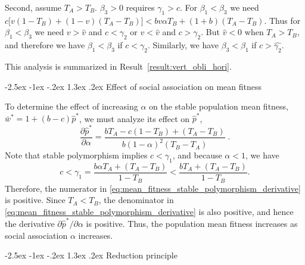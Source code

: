 \documentclass[12pt]{extarticle}
\makeatletter
\renewcommand\section{\@startsection {section}{1}{\z@}%
     {-2.5ex \@plus -1ex \@minus -.2ex}%
     {1.3ex \@plus.2ex}%
    {\Large\bfseries}}
\makeatother
\begin{document}
\begin{appendices}
Second, assume $T_A>T_B$.
$\beta_3>0$ requires $\gamma_1 > c$. 
For $\beta_1<\beta_3$ we need $c\big[v(1-T_B) + (1-v)(T_A-T_B)\big] < bv\alpha T_B + (1+b)(T_A-T_B)$.
Thus for $\beta_1<\beta_3$ we need $v > \hat v$ and $c < \gamma_2 $ or $v < \hat v$ and $c > \gamma_2$.
But $\hat{v}<0$ when $T_A > T_B$, and therefore we have $\beta_1<\beta_3$ if $c < \gamma_2$. Similarly, we have $\beta_3<\beta_1$ if $c > \hat{\gamma_2}$.

This analysis is summarized in Result~\ref{result:vert_obli_hori}.

\section{Effect of social association on mean fitness} \label{sec:appendixC}

To determine the effect of increasing $\alpha$ on the stable population mean fitness, $\bar{w}^*=1+(b-c)\hat{p}^*$, we must analyze its effect on $\hat{p}^*$, 
\begin{equation} \label{eq:mean_fitness_stable_polymorphism_derivative}
  \frac{\partial \hat{p}^*}{\partial \alpha} 
  = \frac{b T_A - c(1-T_B) + (T_A-T_B)}{b (1-\alpha)^2 (T_B-T_A)} \;.
\end{equation} 
Note that stable polymorphism implies $c<\gamma_1$, and because $\alpha<1$, we have
\begin{equation}
c < \gamma_1 = \frac{b \alpha T_A + (T_A-T_B)}{1-T_B} < \frac{b T_A + (T_A-T_B)}{1-T_B}.
\end{equation} 
Therefore, the numerator in \autoref{eq:mean_fitness_stable_polymorphism_derivative} is positive.
Since $T_A<T_B$, the denominator in \autoref{eq:mean_fitness_stable_polymorphism_derivative} is also positive, and hence the derivative $\partial \hat{p}^* / \partial \alpha$ is positive.
Thus, the population mean fitness increases as social association $\alpha$ increases.



\section{Reduction principle} \label{sec:appendixD}


\end{appendices}
\end{document}
